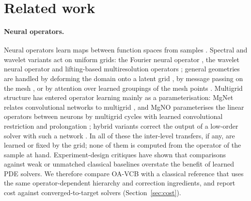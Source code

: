 \section{Related work}\label{sec:related}

\paragraph{Neural operators.} Neural operators learn maps between function spaces from samples
\cite{kovachki2023,lu2021deeponet}. Spectral and wavelet variants act on uniform grids: the Fourier neural operator
\cite{li2021fno}, the wavelet neural operator \cite{tripura2023wno} and lifting-based multiresolution operators
\cite{pandey2026lino}; general geometries are handled by deforming the domain onto a latent grid \cite{li2023geofno}, by
message passing on the mesh \cite{pfaff2021}, or by attention over learned groupings of the mesh points
\cite{wu2024transolver}. Multigrid structure has entered operator learning mainly as a parameterisation: MgNet relates
convolutional networks to multigrid \cite{hexu2019mgnet}, and MgNO parameterises the linear operators between neurons by
multigrid cycles with learned convolutional restriction and prolongation \cite{he2024mgno}; hybrid variants correct the
output of a low-order solver with such a network \cite{hu2025hmgno}. In all of these the inter-level transfers, if any, are
learned or fixed by the grid; none of them is computed from the operator of the sample at hand. Experiment-design
critiques \cite{mcgreivy2024,chatain2025,zhang2026breakeven} have shown that comparisons against weak or unmatched classical
baselines overstate the benefit of learned PDE solvers. We therefore compare OA-VCB with a classical reference that uses the same operator-dependent hierarchy and correction
ingredients, and report cost against converged-to-target solvers (Section~\ref{sec:cost}).

